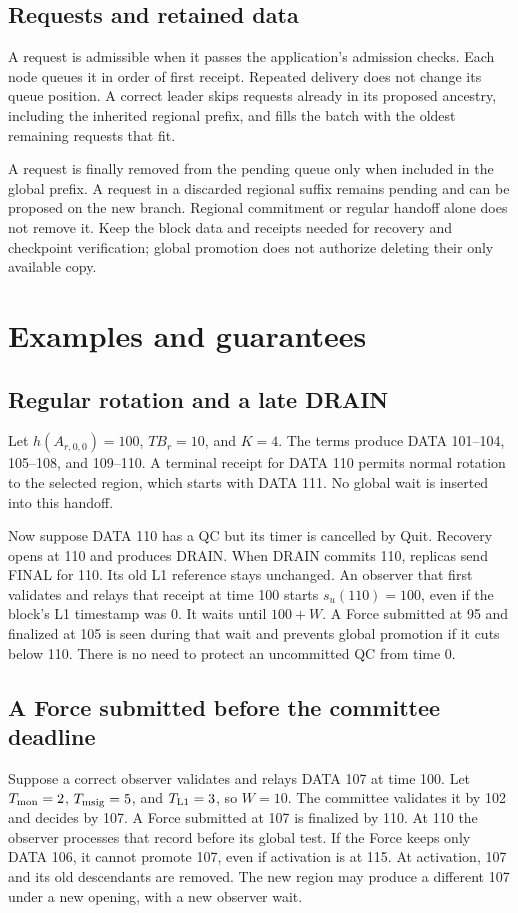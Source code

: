 \documentclass[11pt,a4paper]{article}
\newcommand{\TB}{\mathit{TB}}
\begin{document}
\subsection{Requests and retained data}
\label{sec:requests}
A request is admissible when it passes the application's admission
checks. Each node queues it in order of first receipt. Repeated delivery
does not change its queue position. A correct leader skips requests
already in its proposed ancestry, including the inherited regional
prefix, and fills the batch with the oldest remaining requests that fit.

A request is finally removed from the pending queue only when included
in the global prefix. A request in a discarded regional suffix remains
pending and can be proposed on the new branch. Regional commitment or
regular handoff alone does not remove it. Keep the block data and
receipts needed for recovery and checkpoint verification; global
promotion does not authorize deleting their only available copy.

\section{Examples and guarantees}
\label{sec:examples}

\subsection{Regular rotation and a late DRAIN}
Let $h(A_{r,0,0})=100$, $\TB_r=10$, and $K=4$. The terms produce
DATA 101--104, 105--108, and 109--110. A terminal receipt for DATA 110
permits normal rotation to the selected region, which starts with DATA
111. No global wait is inserted into this handoff.

Now suppose DATA 110 has a QC but its timer is cancelled by Quit.
Recovery opens at 110 and produces DRAIN. When DRAIN commits 110,
replicas send FINAL for 110. Its old L1 reference stays unchanged.
An observer that first validates and relays that receipt at time 100
starts $s_u(110)=100$, even if the block's L1 timestamp was 0. It waits
until $100+W$. A Force submitted at 95 and finalized at 105 is seen
during that wait and prevents global promotion if it cuts below 110.
There is no need to protect an uncommitted QC from time 0.

\subsection{A Force submitted before the committee deadline}
Suppose a correct observer validates and relays DATA 107 at time 100.
Let $T_{\rm mon}=2$, $T_{\rm msig}=5$, and $T_{\rm L1}=3$, so $W=10$.
The committee validates it by 102 and decides by 107. A Force submitted
at 107 is finalized by 110. At 110 the observer processes that record
before its global test. If the Force keeps only DATA 106, it cannot
promote 107, even if activation is at 115. At activation, 107 and its
old descendants are removed. The new region may produce a different
107 under a new opening, with a new observer wait.
\end{document}
